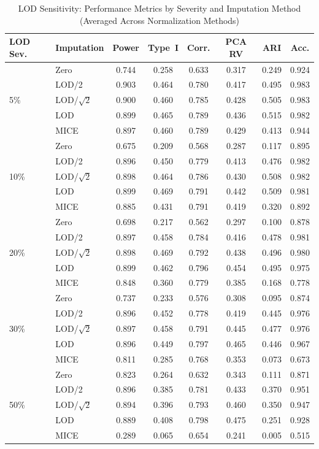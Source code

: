 \documentclass[12pt]{article}
\begin{document}
\begin{table}[ht!]
\centering
\caption{LOD Sensitivity: Performance Metrics by Severity and Imputation Method (Averaged Across Normalization Methods)}
\label{tab:lod_sensitivity}
\small
\begin{tabular}{llcccccc}
\toprule
LOD Sev. & Imputation & Power & Type~I & Corr. & PCA RV & ARI & Acc. \\
\midrule
\multirow{5}{*}{5\%}
 & Zero & 0.744 & 0.258 & 0.633 & 0.317 & 0.249 & 0.924 \\
 & LOD/2 & 0.903 & 0.464 & 0.780 & 0.417 & 0.495 & 0.983 \\
 & LOD/$\sqrt{2}$ & 0.900 & 0.460 & 0.785 & 0.428 & 0.505 & 0.983 \\
 & LOD & 0.899 & 0.465 & 0.789 & 0.436 & 0.515 & 0.982 \\
 & MICE & 0.897 & 0.460 & 0.789 & 0.429 & 0.413 & 0.944 \\
\midrule
\multirow{5}{*}{10\%}
 & Zero & 0.675 & 0.209 & 0.568 & 0.287 & 0.117 & 0.895 \\
 & LOD/2 & 0.896 & 0.450 & 0.779 & 0.413 & 0.476 & 0.982 \\
 & LOD/$\sqrt{2}$ & 0.898 & 0.464 & 0.786 & 0.430 & 0.508 & 0.982 \\
 & LOD & 0.899 & 0.469 & 0.791 & 0.442 & 0.509 & 0.981 \\
 & MICE & 0.885 & 0.431 & 0.791 & 0.419 & 0.320 & 0.892 \\
\midrule
\multirow{5}{*}{20\%}
 & Zero & 0.698 & 0.217 & 0.562 & 0.297 & 0.100 & 0.878 \\
 & LOD/2 & 0.897 & 0.458 & 0.784 & 0.416 & 0.478 & 0.981 \\
 & LOD/$\sqrt{2}$ & 0.898 & 0.469 & 0.792 & 0.438 & 0.496 & 0.980 \\
 & LOD & 0.899 & 0.462 & 0.796 & 0.454 & 0.495 & 0.975 \\
 & MICE & 0.848 & 0.360 & 0.779 & 0.385 & 0.168 & 0.778 \\
\midrule
\multirow{5}{*}{30\%}
 & Zero & 0.737 & 0.233 & 0.576 & 0.308 & 0.095 & 0.874 \\
 & LOD/2 & 0.896 & 0.452 & 0.778 & 0.419 & 0.445 & 0.976 \\
 & LOD/$\sqrt{2}$ & 0.897 & 0.458 & 0.791 & 0.445 & 0.477 & 0.976 \\
 & LOD & 0.896 & 0.449 & 0.797 & 0.465 & 0.446 & 0.967 \\
 & MICE & 0.811 & 0.285 & 0.768 & 0.353 & 0.073 & 0.673 \\
\midrule
\multirow{5}{*}{50\%}
 & Zero & 0.823 & 0.264 & 0.632 & 0.343 & 0.111 & 0.871 \\
 & LOD/2 & 0.896 & 0.385 & 0.781 & 0.433 & 0.370 & 0.951 \\
 & LOD/$\sqrt{2}$ & 0.894 & 0.396 & 0.793 & 0.460 & 0.350 & 0.947 \\
 & LOD & 0.889 & 0.408 & 0.798 & 0.475 & 0.251 & 0.928 \\
 & MICE & 0.289 & 0.065 & 0.654 & 0.241 & 0.005 & 0.515 \\
\bottomrule
\end{tabular}
\end{table}
\end{document}
